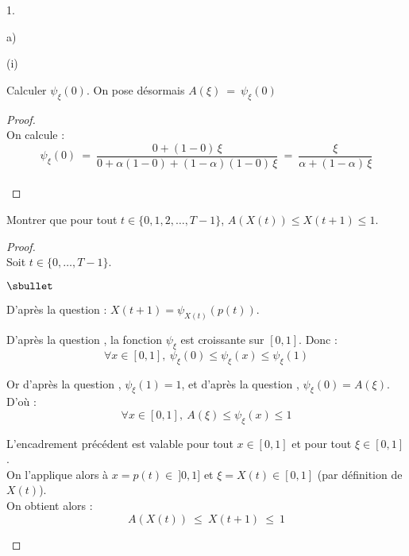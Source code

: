 \begin{noliste}{1.}
\begin{noliste}{a)}
    
    \item 
    \begin{nonoliste}{(i)}
      \item Calculer $\psi_\xi(0)$. On pose désormais
      $
        A(\xi) \ = \ \psi_\xi(0)
      $
      
      \begin{proof}~\\
        On calcule :
        \[
          \psi_\xi(0) \ = \ \dfrac{0 + (1-0) \, \xi}{0 + \alpha
          (1-0) + (1-\alpha)(1-0) \, \xi} \ = \ 
          \dfrac{\xi}{\alpha + (1-\alpha) \, \xi}
        \]
        ~\\[-1cm]
      \end{proof}
      
      
      \newpage

      
      \item Montrer que pour tout $t\in \{0,1,2, \ldots, T-1\}$, 
      $A(X(t)) \leq X(t+1) \leq 1$.
      
      \begin{proof}~\\
      Soit $t \in \{0, \ldots, T-1\}$.
        \begin{noliste}{$\sbullet$}
	  \item D'après la question  : $X(t+1) = 
	  \psi_{X(t)}(p(t))$.
	  
	  \item D'après la question , la fonction 
	  $\psi_\xi$ est croissante sur $[0,1]$. Donc :
	  \[
	    \forall x \in [0,1], \ \psi_\xi(0) \leq \psi_\xi(x) 
	    \leq \psi_\xi(1)
	  \]
	  
	  \item Or d'après la question , $\psi_\xi(1)=1$, et
	  d'après la question , $\psi_\xi(0)=A(\xi)$.
	  D'où :
	  \[
	    \forall x \in [0,1], \ A(\xi) \leq \psi_\xi(x) \leq 1
	  \]
	  
	  \item L'encadrement précédent est valable pour tout $x \in
	  [0,1]$ et pour tout $\xi \in [0,1]$.\\
	  On l'applique alors à $x=p(t) \in \ ]0,1]$ et $\xi = 
	  X(t) \in [0,1]$ (par définition de $X(t)$).\\
	  On obtient alors :
	  \[
	    A(X(t)) \ \leq \ X(t+1) \ \leq \ 1
	  \]
        \end{noliste}
        

\end{proof}
\end{nonoliste}
\end{noliste}
\end{noliste}
